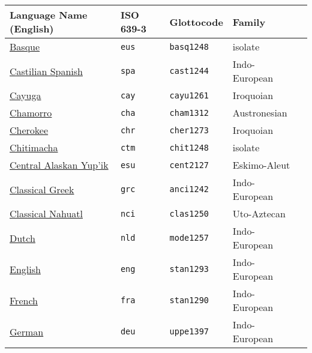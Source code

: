 \begin{longtable}[c]{ l l l l l }
  \onehalfspacing
  \textbf{Language Name (English)}                                                   & \textbf{ISO 639-3} & \textbf{Glottocode} & \textbf{Family}\\
  \midrule
  \href{https://glottolog.org/resource/languoid/id/basq1248}{Basque}                 & \texttt{eus}       & \texttt{basq1248}   & isolate\\
  \href{https://glottolog.org/resource/languoid/id/cast1244}{Castilian Spanish}      & \texttt{spa}       & \texttt{cast1244}   & Indo-European\\
  \href{https://glottolog.org/resource/languoid/id/cayu1261}{Cayuga}                 & \texttt{cay}       & \texttt{cayu1261}   & Iroquoian\\
  \href{https://glottolog.org/resource/languoid/id/cham1312}{Chamorro}               & \texttt{cha}       & \texttt{cham1312}   & Austronesian\\
  \href{https://glottolog.org/resource/languoid/id/cher1273}{Cherokee}               & \texttt{chr}       & \texttt{cher1273}   & Iroquoian\\
  \href{https://glottolog.org/resource/languoid/id/chit1248}{Chitimacha}             & \texttt{ctm}       & \texttt{chit1248}   & isolate\\
  \href{https://glottolog.org/resource/languoid/id/cent2127}{Central Alaskan Yup'ik} & \texttt{esu}       & \texttt{cent2127}   & Eskimo-Aleut\\
  \href{https://glottolog.org/resource/languoid/id/anci1242}{Classical Greek}        & \texttt{grc}       & \texttt{anci1242}   & Indo-European\\
  \href{https://glottolog.org/resource/languoid/id/clas1250}{Classical Nahuatl}      & \texttt{nci}       & \texttt{clas1250}   & Uto-Aztecan\\
  \href{https://glottolog.org/resource/languoid/id/mode1257}{Dutch}                  & \texttt{nld}       & \texttt{mode1257}   & Indo-European\\
  \href{https://glottolog.org/resource/languoid/id/stan1293}{English}                & \texttt{eng}       & \texttt{stan1293}   & Indo-European\\
  \href{https://glottolog.org/resource/languoid/id/stan1290}{French}                 & \texttt{fra}       & \texttt{stan1290}   & Indo-European\\
  \href{https://glottolog.org/resource/languoid/id/uppe1397}{German}                 & \texttt{deu}       & \texttt{uppe1397}   & Indo-European\\

\end{longtable}
